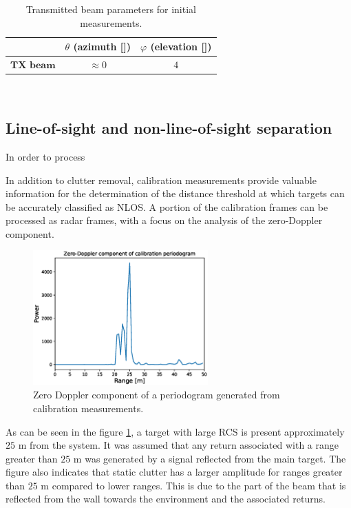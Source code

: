 \begin{table}[H]
	\centering 
	\begin{tabular}{|p{9em} c c |}
		\hline
		\rowcolor{bluepoli!40} %
		\textbf{} & \textbf{$\theta$ (azimuth [\textdegree])} & \textbf{$\varphi$ (elevation [\textdegree])} \T\B \\
		\hline \hline
		$\textbf{TX beam}$ & $\approx 0$ & $4$ \T\B \\
		
		\hline
	\end{tabular}
	\\[10pt]
	\caption{Transmitted beam parameters for initial measurements.}
	\label{table:Test1TXBeamParams}
\end{table}


\subsection{Line-of-sight and non-line-of-sight separation}

In order to process

In addition to clutter removal, calibration measurements provide valuable information for the determination of the distance threshold at which targets can be accurately classified as NLOS. A portion of the calibration frames can be processed as radar frames, with a focus on the analysis of the zero-Doppler component.
	

\begin{figure}[H]
	\centering
	\includegraphics[width=0.6\textwidth]{Images/Test1/cali_static_per_t1.eps}
	\caption{Zero Doppler component of a periodogram generated from calibration measurements.}
	\label{fig:Test1_cali_static_per}
\end{figure}

As can be seen in the figure \ref{fig:Test1_cali_static_per}, a target with large RCS is present approximately $25$ m from the system. It was assumed that any return associated with a range greater than $25$ m was generated by a signal reflected from the main target. The figure also indicates that static clutter has a larger amplitude for ranges greater than $25$ m compared to lower ranges. This is due to the part of the beam that is reflected from the wall towards the environment and the associated returns.

